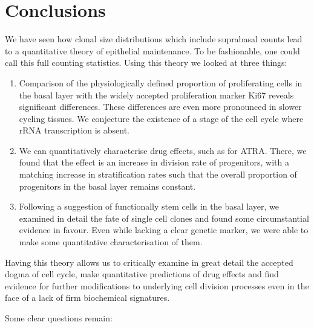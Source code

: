 \documentclass[10pt,english]{report}
\begin{document}
\section{Conclusions}

We have seen how clonal size distributions which include suprabasal counts lead to a quantitative theory of epithelial maintenance. To be fashionable, one could call this full counting statistics. Using this theory we looked at three things:

\begin{enumerate}
\item Comparison of the physiologically defined proportion of proliferating cells in the basal layer with the widely accepted proliferation marker Ki67 reveals significant differences. These differences are even more pronounced in slower cycling tissues. We conjecture the existence of a stage of the cell cycle where rRNA transcription is absent.

\item We can quantitatively characterise drug effects, such as for ATRA. There, we found that the effect is an increase in division rate of progenitors, with a matching increase in stratification rates such that the overall proportion of progenitors in the basal layer remains constant.

\item Following a suggestion of functionally stem cells in the basal layer, we examined in detail the fate of single cell clones and found some circumstantial evidence in favour. Even while lacking a clear genetic marker, we were able to make some quantitative characterisation of them.
\end{enumerate}

Having this theory allows us to critically examine in great detail the accepted dogma of cell cycle, make quantitative predictions of drug effects and find evidence for further modifications to underlying cell division processes even in the face of a lack of firm biochemical signatures.

Some clear questions remain:
\end{document}
